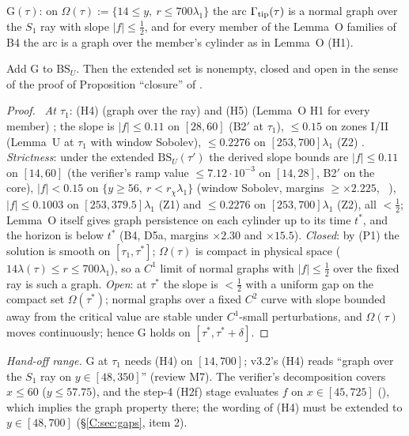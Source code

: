 \documentclass[11pt]{article}
\begin{document}
\begin{definition}[G]\label{C:def:G}
$\mathrm{G}(\tau)$: on $\Omega(\tau):=\{14\le y,\ r\le700\lambda_1\}$ the arc $\Gamma_{\rm tip}(\tau)$ is a normal graph over the $S_1$ ray with slope $|f|\le\frac12$, and for every member of the Lemma~O families of B4 the arc is a graph over the member's cylinder as in Lemma~O (H1).
\end{definition}

\begin{lemma}\label{C:lem:G}
Add $\mathrm{G}$ to $\mathrm{BS}_U$. Then the extended set is nonempty, closed and open in the sense of the proof of Proposition ``closure'' of .
\end{lemma}
\begin{proof}\tP\ \emph{At $\tau_1$}: (H4) (graph over the ray) and (H5) (Lemma~O H1 for every member) \tH; the slope is $|f|\le0.11$ on $[28,60]$ (B2$'$ at $\tau_1$), $\le0.15$ on zones I/II (Lemma~U at $\tau_1$ with window Sobolev), $\le0.2276$ on $[253,700]\lambda_1$ (Z2) \tC. \emph{Strictness}: under the extended $\mathrm{BS}_U(\tau')$ the derived slope bounds are $|f|\le0.11$ on $[14,60]$ (the verifier's ramp value $\le7.12\cdot10^{-3}$ on $[14,28]$, B2$'$ on the core), $|f|<0.15$ on $\{y\ge56,\ r<r_\chi\lambda_1\}$ (window Sobolev, margins $\ge\times2.225$, \SU\ ), $|f|\le0.1003$ on $[253,379.5]\lambda_1$ (Z1) and $\le0.2276$ on $[253,700]\lambda_1$ (Z2), all $<\frac12$; Lemma~O itself gives graph persistence on each cylinder up to its time $t^*$, and the horizon is below $t^*$ (B4, D5a, margins $\times2.30$ and $\times15.5$). \emph{Closed}: by (P1) the solution is smooth on $[\tau_1,\tau^*]$; $\Omega(\tau)$ is compact in physical space ($14\lambda(\tau)\le r\le700\lambda_1$), so a $C^1$ limit of normal graphs with $|f|\le\frac12$ over the fixed ray is such a graph. \emph{Open}: at $\tau^*$ the slope is $<\frac12$ with a uniform gap on the compact set $\Omega(\tau^*)$; normal graphs over a fixed $C^2$ curve with slope bounded away from the critical value are stable under $C^1$-small perturbations, and $\Omega(\tau)$ moves continuously; hence G holds on $[\tau^*,\tau^*+\delta]$.
\end{proof}
\noindent\emph{Hand-off range.} G at $\tau_1$ needs (H4) on $[14,700]$; v3.2's (H4) reads ``graph over the $S_1$ ray on $y\in[48,350]$'' (review M7). The verifier's decomposition covers $x\le60$ ($y\le57.75$), and the step-4 (H2f) stage evaluates $f$ on $x\in[45,725]$ (), which implies the graph property there; the wording of (H4) must be extended to $y\in[48,700]$ (\S\ref{C:sec:gaps}, item 2).
\end{document}
